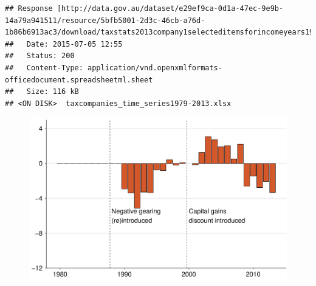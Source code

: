\documentclass{grattan}\usepackage[]{graphicx}\usepackage[]{color}
\makeatletter
\newenvironment{kframe}{%
 \def\at@end@of@kframe{}%
 \ifinner\ifhmode%
  \def\at@end@of@kframe{\end{minipage}}%
  \begin{minipage}{\columnwidth}%
 \fi\fi%
 \def\FrameCommand##1{\hskip\@totalleftmargin \hskip-\fboxsep
 \colorbox{shadecolor}{##1}\hskip-\fboxsep
     \hskip-\linewidth \hskip-\@totalleftmargin \hskip\columnwidth}%
 \MakeFramed {\advance\hsize-\width
   \@totalleftmargin\z@ \linewidth\hsize
   \@setminipage}}%
 {\par\unskip\endMakeFramed%
 \at@end@of@kframe}
\newenvironment{knitrout}{}{} %
\makeatother
\begin{document}
\begin{knitrout}
\color{fgcolor}\begin{kframe}
\begin{verbatim}
## Response [http://data.gov.au/dataset/e29ef9ca-0d1a-47ec-9e9b-14a79a941511/resource/5bfb5001-2d3c-46cb-a76d-1b86b6913ac3/download/taxstats2013company1selecteditemsforincomeyears197980to201213.xlsx]
##   Date: 2015-07-05 12:55
##   Status: 200
##   Content-Type: application/vnd.openxmlformats-officedocument.spreadsheetml.sheet
##   Size: 116 kB
## <ON DISK>  taxcompanies_time_series1979-2013.xlsx
\end{verbatim}
\end{kframe}
\end{knitrout}


\begin{figure}[t]
\includegraphics[width=\columnwidth]{figure/Net_rent_over_time_companies-1}
\end{figure}
\end{document}
